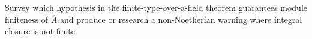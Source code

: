 \begin{problem}\label{chal:vi28-04}
Survey which hypothesis in the finite-type-over-a-field theorem guarantees module finiteness of $\overline A$ and produce or research a non-Noetherian warning where integral closure is not finite.
\end{problem}
